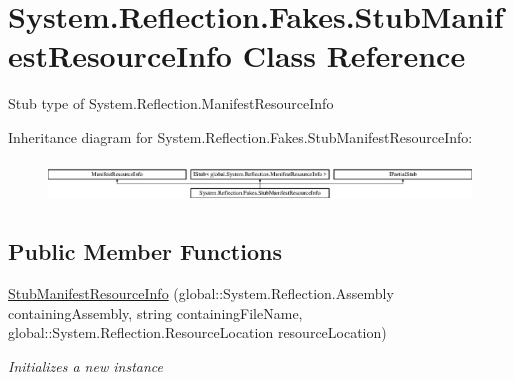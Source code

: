 \hypertarget{class_system_1_1_reflection_1_1_fakes_1_1_stub_manifest_resource_info}{\section{System.\-Reflection.\-Fakes.\-Stub\-Manifest\-Resource\-Info Class Reference}
\label{class_system_1_1_reflection_1_1_fakes_1_1_stub_manifest_resource_info}
}


Stub type of System.\-Reflection.\-Manifest\-Resource\-Info 


Inheritance diagram for System.\-Reflection.\-Fakes.\-Stub\-Manifest\-Resource\-Info\-:\begin{figure}[H]
\begin{center}
\leavevmode
\includegraphics[height=1.107814cm]{class_system_1_1_reflection_1_1_fakes_1_1_stub_manifest_resource_info}
\end{center}
\end{figure}
\subsection*{Public Member Functions}
\begin{DoxyCompactItemize}
\item 
\hyperlink{class_system_1_1_reflection_1_1_fakes_1_1_stub_manifest_resource_info_ac50f90de6e37eb92912e3acc6a7a6730}{Stub\-Manifest\-Resource\-Info} (global\-::\-System.\-Reflection.\-Assembly containing\-Assembly, string containing\-File\-Name, global\-::\-System.\-Reflection.\-Resource\-Location resource\-Location)
\begin{DoxyCompactList}\small\item\em Initializes a new instance\end{DoxyCompactList}\end{DoxyCompactItemize}
